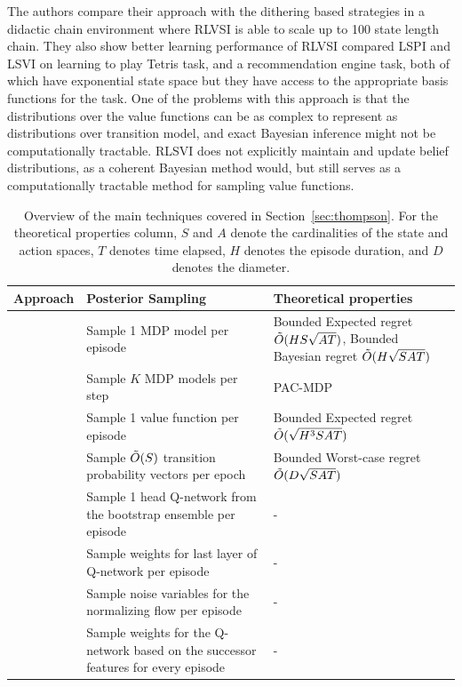 The authors compare their approach with the dithering based strategies in a didactic chain environment where RLVSI is able to scale up to 100 state length chain. They also show better learning performance of RLVSI compared LSPI and LSVI on learning to play Tetris task, and a recommendation engine task, both of which have exponential state space but they have access to the appropriate basis functions for the task.
One of the problems with this approach is that the distributions over the value functions can be as complex to represent as distributions over transition model, and exact Bayesian inference might not be computationally tractable. RLSVI does not explicitly maintain and update belief distributions, as a coherent Bayesian method would, but still serves as a computationally tractable method for sampling value functions. 
\begin{table}
    \centering
    \begin{tabularx}{\columnwidth}{p{}|p{}|p{}}
        Approach & Posterior Sampling & Theoretical properties \\
        \hline
         & Sample 1 MDP model per episode  & Bounded Expected regret \newline $\Tilde{O}(HS\sqrt{AT})$, \newline Bounded Bayesian regret \newline $\Tilde{O}(H\sqrt{SAT})$
        \\
         & Sample $K$ MDP models per step & PAC-MDP
        \\
         & Sample 1 value function per episode & Bounded Expected regret \newline $\Tilde{O}(\sqrt{H^3SAT})$
        \\
         & Sample $\Tilde{O}(S)$ transition probability vectors per epoch &  Bounded Worst-case regret \newline $\Tilde{O}(D\sqrt{SAT})$
        \\
         & Sample 1 head Q-network from the bootstrap ensemble per episode & - \\ 
         & Sample weights for last layer of Q-network per episode & - \\
         & Sample noise variables for the normalizing flow per episode & - \\
         & Sample weights for the Q-network based on the successor features for every episode & - \\
    \end{tabularx}
    \caption{Overview of the main techniques covered in Section~\ref{sec:thompson}. For the theoretical properties column, $S$ and $A$ denote the cardinalities of the state and action spaces, $T$ denotes time elapsed, $H$ denotes the episode duration, and $D$ denotes the diameter.
    }
    \label{tab:thompson}
\end{table}
